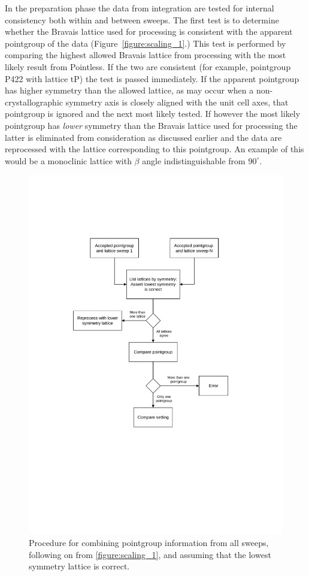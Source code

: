 \documentclass[preprint,pdf]{iucr}
\begin{document}
In the preparation phase the data from integration are tested for
internal consistency both within and between sweeps. The first test is
to determine whether the Bravais lattice used for processing is
consistent with the apparent pointgroup of the data
(Figure~\ref{figure:scaling_1}.)
This test is performed by comparing the highest allowed Bravais
lattice from processing with the most likely result from Pointless. If
the two are consistent (for example, pointgroup P422 with lattice tP)
the test is passed immediately. If the apparent pointgroup has higher
symmetry than the allowed lattice, as may occur when a
non-crystallographic symmetry axis is closely aligned with the unit cell
axes, that pointgroup is ignored and the next most likely tested. If
however the most likely pointgroup has \emph{lower} symmetry than the
Bravais lattice used for processing the latter is eliminated from
consideration as discussed earlier and the data are reprocessed with
the lattice corresponding to this pointgroup. An example of this would
be a monoclinic lattice with $\beta$ angle indistinguishable
from $90^{\circ}$. 

\begin{figure}
\caption{Procedure for combining pointgroup information from all
  sweeps, following on from \ref{figure:scaling_1}, and assuming that
  the lowest symmetry lattice is correct.
\label{figure:scaling_2}}
\centering
\includegraphics[scale=0.5]{figures/scaling-step-2.pdf}
\end{figure}
\end{document}

